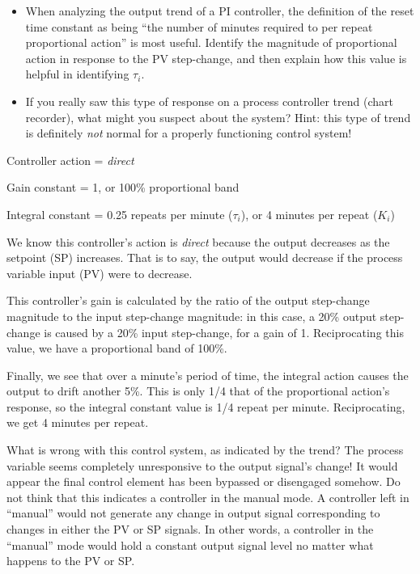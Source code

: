 \begin{itemize}
\item{} When analyzing the output trend of a PI controller, the definition of the reset time constant as being ``the number of minutes required to per repeat proportional action'' is most useful.  Identify the magnitude of proportional action in response to the PV step-change, and then explain how this value is helpful in identifying $\tau_i$.
\item{} If you really saw this type of response on a process controller trend (chart recorder), what might you suspect about the system?  Hint: this type of trend is definitely {\it not} normal for a properly functioning control system!
\end{itemize}







Controller action = {\it direct}

\vskip 10pt

Gain constant = 1, or 100\% proportional band

\vskip 10pt

Integral constant = 0.25 repeats per minute ($\tau_i$), or 4 minutes per repeat ($K_i$)







We know this controller's action is {\it direct} because the output decreases as the setpoint (SP) increases.  That is to say, the output would decrease if the process variable input (PV) were to decrease.  

This controller's gain is calculated by the ratio of the output step-change magnitude to the input step-change magnitude: in this case, a 20\% output step-change is caused by a 20\% input step-change, for a gain of 1.  Reciprocating this value, we have a proportional band of 100\%.

Finally, we see that over a minute's period of time, the integral action causes the output to drift another 5\%.  This is only 1/4 that of the proportional action's response, so the integral constant value is 1/4 repeat per minute.  Reciprocating, we get 4 minutes per repeat.
 
\vskip 10pt

What is wrong with this control system, as indicated by the trend?  The process variable seems completely unresponsive to the output signal's change!  It would appear the final control element has been bypassed or disengaged somehow.  Do not think that this indicates a controller in the manual mode.  A controller left in ``manual'' would not generate any change in output signal corresponding to changes in either the PV or SP signals.  In other words, a controller in the ``manual'' mode would hold a constant output signal level no matter what happens to the PV or SP.





